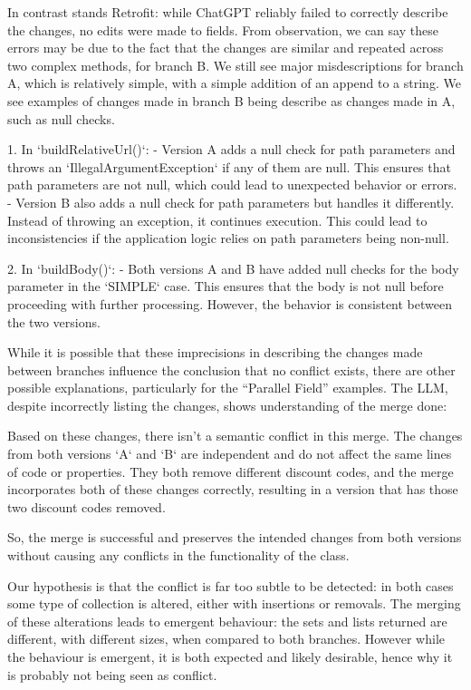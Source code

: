 In contrast stands Retrofit: while ChatGPT reliably failed to correctly describe the changes, no edits were made to fields. From observation, we can say these errors may be due
to the fact that the changes are similar and repeated across two complex methods, for branch B. We still see major misdescriptions for branch A, which is relatively simple, with a simple addition of an append to a string.
We see examples of changes made in branch B being describe as changes made in A, such as null checks.
\begin{response}
    1. In `buildRelativeUrl()`:
    - Version A adds a null check for path parameters and throws an `IllegalArgumentException` if any of them are null. This ensures that path parameters are not null, which could lead to unexpected behavior or errors.
    - Version B also adds a null check for path parameters but handles it differently. Instead of throwing an exception, it continues execution. This could lead to inconsistencies if the application logic relies on path parameters being non-null.

 2. In `buildBody()`:
    - Both versions A and B have added null checks for the body parameter in the `SIMPLE` case. This ensures that the body is not null before proceeding with further processing. However, the behavior is consistent between the two versions.
\end{response}

While it is possible that these imprecisions in describing the changes made between branches influence the conclusion that no conflict exists, there are other possible explanations, particularly for the ``Parallel Field'' examples.
The LLM, despite incorrectly listing the changes, shows understanding of the merge done:
\begin{response}
Based on these changes, there isn't a semantic conflict in this merge. The changes from both versions `A` and `B` are independent and do not affect the same lines of code or properties. They both remove different discount codes, and the merge incorporates both of these changes correctly, resulting in a version that has those two discount codes removed.

So, the merge is successful and preserves the intended changes from both versions without causing any conflicts in the functionality of the class.
\end{response}
Our hypothesis is that the conflict is far too subtle to be detected: in both cases some type of collection is altered, either with insertions or removals.
The merging of these alterations leads to emergent behaviour: the sets and lists returned are different, with different sizes, when compared to both branches.
However while the behaviour is emergent, it is both expected and likely desirable, hence why it is probably not being seen as conflict.

